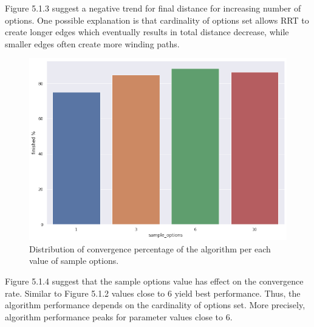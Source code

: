 \documentclass[a4paper,12pt]{article}
\DeclareRobustCommand{\[}{\begin{equation}}
\DeclareRobustCommand{\]}{\end{equation}}
\numberwithin{equation}{section}
\numberwithin{algorithm}{section}
\begin{document}
Figure 5.1.3 suggest a negative trend for final distance for increasing number of options. One possible explanation is that cardinality of options set allows RRT to create longer edges which eventually results in total distance decrease, while smaller edges often create more winding paths.
\begin{figure}[H]
\begin{center}
\includegraphics[scale=0.4]{images/so_finished.png}
\captionsetup{width=0.6\textwidth}
\caption{Distribution of convergence percentage of the algorithm per each value of sample options.}
\end{center}
\end{figure}
Figure 5.1.4 suggest that the sample options value has effect on the convergence rate. Similar to Figure 5.1.2 values close to 6 yield best performance.
Thus, the algorithm performance depends on the cardinality of options set. More precisely, algorithm performance peaks for parameter values close to 6.
\end{document}
